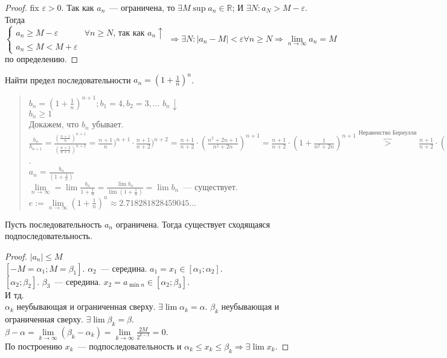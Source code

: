 \documentclass[12pt]{article}
\begin{document}
	\begin{proof}
		fix $\varepsilon > 0$. Так как $a_n$~--- ограничена, то $\exists M  \sup a_n \in \mathbb{R}$; И $\exists N: a_N > M - \varepsilon$. \\
		Тогда $\begin{cases}
			a_n \geqslant M - \varepsilon & \forall n \geqslant N \text{, так как } a_n \uparrow \\
			a_n \leqslant M < M + \varepsilon
		\end{cases} \Rightarrow \exists N: |a_n - M| < \varepsilon \forall n \geqslant N \Rightarrow \lim\limits_{n \rightarrow \infty} a_n = M$ по определению.
	\end{proof}
	\begin{definition}
		Найти предел последовательности $a_n = (1 + \frac{1}{n})^n$.
		\begin{quote}
			$b_n = (1 + \frac{1}{n})^{n + 1}; b_1 = 4, b_2 = 3,...$ $b_n \downarrow$ \\
			$b_n \geqslant 1$ \\
			Докажем, что $b_n$ убывает. \\
			$\frac{b_n}{b_{n + 1}} = \frac{(\frac{n + 1}{n})^{n + 1}}{(\frac{n + 2}{n + 1})^{n + 2}} = \frac{n + 1}{n})^{n + 1} \cdot \frac{n + 1}{n + 2})^{n + 2} = \frac{n + 1}{n + 2} \cdot (\frac{n^2 + 2n + 1}{n^2 + 2n})^{n + 1} = \frac{n + 1}{n + 2} \cdot (1 + \frac{1}{n^2 + 2n})^{n + 1} \overbrace{>}^{\text{Неравенство Бернулли}} \frac{n + 1}{n + 2} \cdot (1 + \frac{n + 1}{n^2 + 2n}) = \frac{(n + 1)(n^2 + 3n + 1)}{(n + 2)(n^2 + 2n)} = \frac{n^3 + 4n^2 + 4n + 1}{n^3 + 4n^2 + 4n} > 1$. \\
			$a_n = \frac{b_n}{(1 + \frac{1}{n})}$ \\
			$\lim\limits_{n \rightarrow \infty} = \lim \frac{b_n}{1 + \frac{1}{n}} = \frac{\lim b_n}{\lim (1 + \frac{1}{n})} = \lim b_n$~--- существует. \\
			$e := \lim\limits_{n \rightarrow \infty} (1 + \frac{1}{n})^n \approx 2.718281828459045...$
		\end{quote}
	\end{definition}
	\begin{theorem}[Вейерштрасса]
		Пусть последовательность $a_n$ ограничена. Тогда существует сходящаяся подпоследовательность.
	\end{theorem}
	\begin{proof}
		$|a_n| \leqslant M$ \\
		$[-M = \alpha_1; M = \beta_1]$. $\alpha_2$~--- середина. $a_1 = x_1 \in [\alpha_1; \alpha_2]$. \\
		$[\alpha_2; \beta_2]$. $\beta_3$~--- середина. $x_2 = a_{\min n} \in [\alpha_2; \beta_3]$. \\
		И тд. \\
		${\alpha_k}$ неубывающая и ограниченная сверху. $\exists \lim \alpha_k = \alpha$. ${\beta_k}$ неубывающая и ограниченная сверху. $\exists \lim \beta_k = \beta$. \\
		$\beta - \alpha = \lim \limits_{k \rightarrow \infty} (\beta_k - \alpha_k) = \lim \limits_{k \rightarrow \infty} \frac{2M}{2^{k - 1}} = 0$. \\
		По построению $x_k$~--- подпоследовательность и $\alpha_k \leqslant x_k \leqslant \beta_k \Rightarrow \exists \lim x_k$.
	\end{proof}
\end{document}
